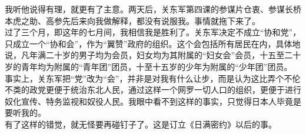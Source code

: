 我听他说得有理，就更有了主意。两天后，关东军第四课的参谋片仓衷、参谋长桥本虎之助、高参先后来向我做解释，都没有说服我。事情就拖下来了。\\

过了三个月，即这年的七月间，我相信我是胜利了。关东军决定不成立“协和党”，只成立一个“协和会”，作为“翼赞”政府的组织。这个会包括所有居民在内，具体地说，凡年满二十岁的男子均为会员，妇女均为其附属的“妇女会”会员，十五至二十岁的青年均为附属的“青年团”团员，十至十五岁的少年为附属的“少年团”团员。\\

事实上，关东军把“党”改为“会”，并非是对我有什么让步，而是认为这比弄个不伦不类的政党更便于统治东北人民，通过这样一个网罗一切人口的组织，更便于进行奴化宣传、特务监视和奴役人民。我眼中看不到这样的事实，只觉得日本人毕竟是要听我的。\\

有了这样的错觉，就无怪要再碰钉子了。这是订立《日满密约》以后的事。
